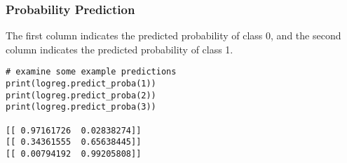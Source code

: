 \begin{frame}[fragile]\frametitle{Probability Prediction}

The first column indicates the predicted probability of class 0, and the second column indicates the predicted probability of class 1.

\begin{lstlisting}
# examine some example predictions
print(logreg.predict_proba(1))
print(logreg.predict_proba(2))
print(logreg.predict_proba(3))

[[ 0.97161726  0.02838274]]
[[ 0.34361555  0.65638445]]
[[ 0.00794192  0.99205808]]
\end{lstlisting}

\end{frame}

